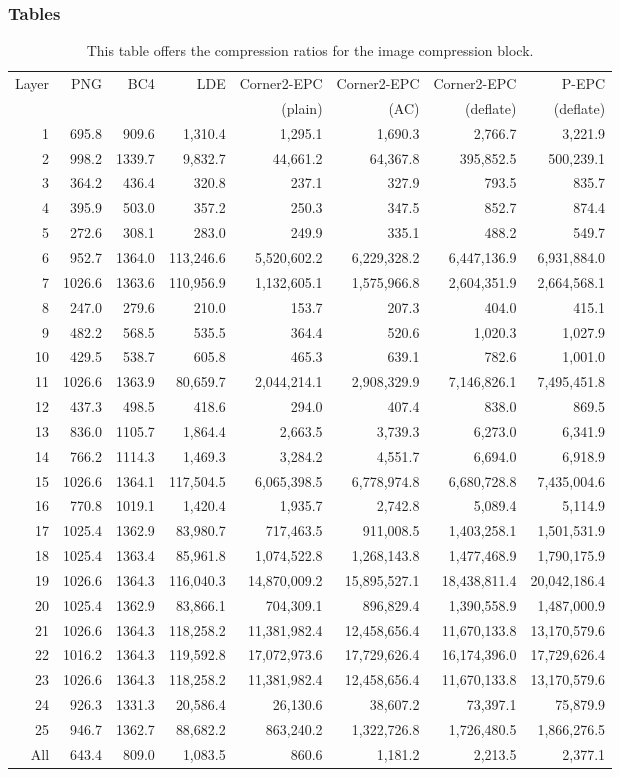 \documentclass{article}
\begin{document}
\subsubsection*{Tables}
\begin{table}
\caption{This table offers the compression ratios for the image 
compression block.}
\label{table:compression-denny}
\begin{center}
\begin{tabular}{r r r r r r r r}
\hline
\hline
Layer & PNG & BC4 & LDE & Corner2-EPC & Corner2-EPC & Corner2-EPC & P-EPC \tabularnewline
\mbox{} & \mbox{} & \mbox{} & \mbox{} & (plain) & (AC) & (deflate)
& (deflate) \tabularnewline
\hline
1 & 695.8 & 909.6 & 1,310.4 & 1,295.1 & 1,690.3 & 2,766.7 & 3,221.9
\tabularnewline
2 & 998.2 & 1339.7 & 9,832.7 & 44,661.2 & 64,367.8 & 395,852.5 & 500,239.1
\tabularnewline
3 & 364.2 & 436.4 & 320.8 & 237.1 & 327.9 & 793.5 & 835.7
\tabularnewline
4 & 395.9 & 503.0 & 357.2 & 250.3 & 347.5 & 852.7 & 874.4
\tabularnewline
5 & 272.6 & 308.1 & 283.0 & 249.9 & 335.1 & 488.2 & 549.7
\tabularnewline
6 & 952.7 & 1364.0 & 113,246.6 & 5,520,602.2 & 6,229,328.2 & 6,447,136.9 & 6,931,884.0
\tabularnewline
7 & 1026.6 & 1363.6 & 110,956.9 & 1,132,605.1 & 1,575,966.8 & 2,604,351.9 & 2,664,568.1
\tabularnewline
8 & 247.0 & 279.6 & 210.0 & 153.7 & 207.3 & 404.0 & 415.1
\tabularnewline
9 & 482.2 & 568.5 & 535.5 & 364.4 & 520.6  & 1,020.3 & 1,027.9
\tabularnewline
10 & 429.5 & 538.7 & 605.8 & 465.3 & 639.1 & 782.6 & 1,001.0
\tabularnewline
11 & 1026.6 & 1363.9 & 80,659.7 & 2,044,214.1 & 2,908,329.9 & 7,146,826.1 & 7,495,451.8
\tabularnewline
12 & 437.3 & 498.5 & 418.6 & 294.0 & 407.4 & 838.0 & 869.5
\tabularnewline
13 & 836.0 & 1105.7 & 1,864.4 & 2,663.5 & 3,739.3 & 6,273.0 & 6,341.9
\tabularnewline
14 & 766.2 & 1114.3 & 1,469.3 & 3,284.2 & 4,551.7 & 6,694.0 & 6,918.9
\tabularnewline
15 & 1026.6 & 1364.1 & 117,504.5 & 6,065,398.5 & 6,778,974.8 & 6,680,728.8 & 7,435,004.6
\tabularnewline
16 & 770.8 & 1019.1 & 1,420.4 & 1,935.7 & 2,742.8 & 5,089.4 & 5,114.9
\tabularnewline
17 & 1025.4 & 1362.9 & 83,980.7 & 717,463.5 & 911,008.5 & 1,403,258.1 & 1,501,531.9
\tabularnewline
18 & 1025.4 & 1363.4 & 85,961.8 & 1,074,522.8 & 1,268,143.8 & 1,477,468.9 & 1,790,175.9
\tabularnewline
19 & 1026.6 & 1364.3 & 116,040.3 & 14,870,009.2 & 15,895,527.1 & 18,438,811.4 & 20,042,186.4
\tabularnewline
20 & 1025.4 & 1362.9 & 83,866.1 & 704,309.1 & 896,829.4 & 1,390,558.9 & 1,487,000.9
\tabularnewline
21 & 1026.6 & 1364.3 & 118,258.2 & 11,381,982.4 & 12,458,656.4 & 11,670,133.8 & 13,170,579.6
\tabularnewline
22 & 1016.2 & 1364.3 & 119,592.8 & 17,072,973.6 &  17,729,626.4 & 16,174,396.0 & 17,729,626.4
\tabularnewline
23 & 1026.6 & 1364.3 & 118,258.2 & 11,381,982.4 & 12,458,656.4 & 11,670,133.8 & 13,170,579.6
\tabularnewline
24 & 926.3 & 1331.3 & 20,586.4 & 26,130.6 & 38,607.2 & 73,397.1 & 75,879.9
\tabularnewline
25 & 946.7 & 1362.7 & 88,682.2 & 863,240.2 & 1,322,726.8 & 1,726,480.5 & 1,866,276.5
\tabularnewline
All & 643.4 & 809.0 & 1,083.5 & 860.6 & 1,181.2 & 2,213.5 & 2,377.1
\tabularnewline
\hline \hline
\end{tabular}
\par\end{center}
\end{table}
\end{document}
